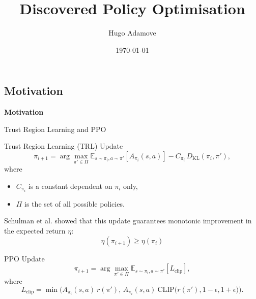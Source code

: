 \documentclass[9pt]{beamer}
\title[Discovered Policy Optimisation]{Discovered Policy Optimisation}
\author[H. Adamove]{Hugo Adamove\texorpdfstring{\\}{, }}
\institute[MU]{IV125 Formela lab seminar}
\date{\today}
\begin{document}
\frame{\titlepage}

\begin{frame}[plain]
  \section{Motivation}
  \vfill
  \begin{center}
    \Huge \textbf{Motivation}
  \end{center}
  \vfill
\end{frame}



\begin{frame}{Trust Region Learning and PPO}
  \begin{block}{Trust Region Learning (TRL) Update}
    \begin{equation}
      \pi_{i+1} = \arg \max_{\pi' \in \Pi} \mathbb{E}_{s \sim \pi_i, a \sim \pi'} \left[ A_{\pi_i}(s,a) \right] - C_{\pi_i} \, D_{\text{KL}}(\pi_i, \pi'),
    \end{equation}
    where
    \begin{itemize}
        \item   \(C_{\pi_i}\) is a constant dependent on \(\pi_i\) only,
        \item \( \Pi \) is the set of all possible policies.
    \end{itemize}
    \vfill
    \pause
     Schulman et al. \cite{trl2015} showed that this update guarantees monotonic improvement in the expected return \( \eta\):
    \[
    \eta(\pi_{i+1}) \geq \eta(\pi_i)
    \]
  \end{block}

\pause

\vfill
  
  \begin{block}{PPO Update}
    \begin{equation}
      \pi_{i+1} = \arg \max_{\pi' \in \Pi} \mathbb{E}_{s \sim \pi_i, a \sim \pi'} \left[ L_{\text{clip}} \right],
    \end{equation}
    where
    \[
 L_{\text{clip}} = \min \Bigg ( A_{\pi_i}(s,a)\ r(\pi'), \,  A_{\pi_i}(s,a)\ \text{CLIP} \Big( r(\pi'), 1 - \epsilon, 1 + \epsilon \Big) \Bigg).
    \]
  \end{block}
\end{frame}
\end{document}
